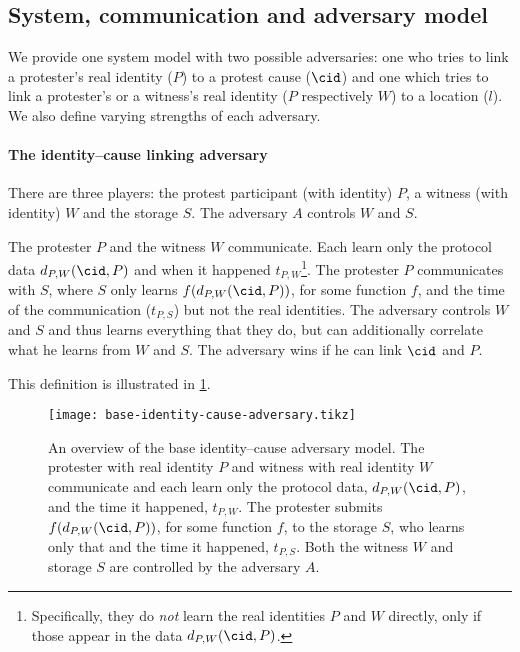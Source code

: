 \subsection{System, communication and adversary model}%
\label{adversary-model}

We provide one system model with two possible adversaries: one who tries to 
link a protester's real identity (\(P\)) to a protest cause (\(\cid\)) and one 
which tries to link a protester's or a witness's real identity (\(P\) 
respectively \(W\)) to a location (\(l\)).
We also define varying strengths of each adversary.

\paragraph{The identity--cause linking adversary}

There are three players: the protest participant (with identity) \(P\), a 
witness (with identity) \(W\) and the storage \(S\).
The adversary \(A\) controls \(W\) and \(S\).

\begin{definition}%
  \label{base-identity-cause-adversary}
  The protester \(P\) and the witness \(W\) communicate.
  Each learn only the protocol data \(d_{P,W}(\cid, P)\) and when it happened 
  \(t_{P,W}\)\footnote{%
    Specifically, they do \emph{not} learn the real identities \(P\) and \(W\) 
    directly, only if those appear in the data \(d_{P,W}(\cid, P)\).
  }.
  The protester \(P\) communicates with \(S\), where \(S\) only learns 
  \(f(d_{P,W}(\cid, P))\), for some function \(f\), and the time of the 
  communication (\(t_{P,S}\)) but not the real identities.
  The adversary controls \(W\) and \(S\) and thus learns everything that they 
  do, but can additionally correlate what he learns from \(W\) and \(S\).
  The adversary wins if he can link \(\cid\) and \(P\).
\end{definition}

This definition is illustrated in \cref{fig:identity-cause-adversary}.

\begin{figure}
  \centering
  \texttt{[image: base-identity-cause-adversary.tikz]}
  \caption{\label{fig:identity-cause-adversary}%
    An overview of the base identity--cause adversary model.
    The protester with real identity \(P\) and witness with real identity \(W\) 
    communicate and each learn only the protocol data, \(d_{P,W}(\cid, P)\), 
    and the time it happened, \(t_{P,W}\).
    The protester submits \(f(d_{P,W}(\cid, P))\), for some function \(f\), to 
    the storage \(S\), who learns only that and the time it happened, 
    \(t_{P,S}\).
    Both the witness \(W\) and storage \(S\) are controlled by the adversary 
    \(A\).
  }
\end{figure}

